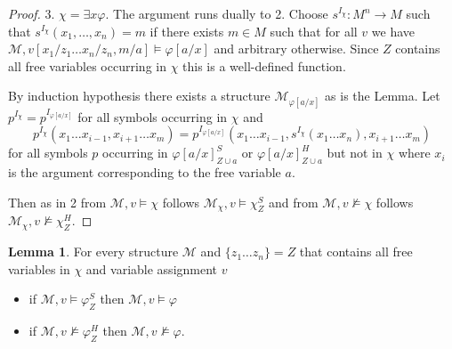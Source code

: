 \documentclass[a4paper,12pt]{report}
\theoremstyle{definition}
\theoremstyle{definition}
\theoremstyle{definition}
\newtheorem{lemma}[theorem]{Lemma}
\theoremstyle{definition}
\theoremstyle{definition}
\theoremstyle{definition}
\theoremstyle{definition}
\begin{document}
\begin{proof}
		3. $\chi = \exists x\varphi$. The argument runs dually to 2. Choose $s^{I_\chi}:M^n\to M$ such that $s^{I_\chi}(x_1,\dots, x_n) = m$ if there exists $m\in M$ such that for all $v$ we have $\mathcal M, v[x_1/z_1\dots x_n/z_n, m/a]\models\varphi[a/x]$ and arbitrary otherwise. Since $Z$ contains all free variables occurring in $\chi$ this is a well-defined function.
		
		By induction hypothesis there exists a structure $\mathcal M_{\varphi[a/x]}$ as is the Lemma. Let $p^{I_\chi} = p^{I_{\varphi[a/x]}}$ for all symbols occurring in $\chi$ and $$p^{I_\chi}(x_1\dots x_{i-1}, x_{i+1}\dots x_m) = p^{I_{\varphi[a/x]}}(x_1\dots x_{i-1}, s^{I_\chi}(x_1\dots x_n), x_{i+1}\dots x_m)$$ for all symbols $p$ occurring in $\varphi[a/x]^S_{Z\cup a}$ or $\varphi[a/x]^H_{Z\cup a}$ but not in $\chi$ where $x_i$ is the argument corresponding to the free variable $a$.
		
		Then as in 2 from $\mathcal M, v\models \chi$ follows $\mathcal M_\chi,v\models\chi^S_Z$ and from $\mathcal M, v\not\models \chi$ follows $\mathcal M_\chi,v\not\models\chi^H_Z$.
	\end{proof}
	
	\begin{lemma}
		For every structure $\mathcal M$ and $\{z_1\dots z_n\} = Z$ that contains all free variables in $\chi$ and variable assignment $v$
		\begin{itemize}
			\item if $\mathcal M, v\models\varphi^S_Z$ then $\mathcal M, v\models \varphi$
			\item if $\mathcal M, v\not\models\varphi^H_Z$ then $\mathcal M, v\not\models\varphi$.
		\end{itemize}
	\end{lemma}
	
\end{document}

